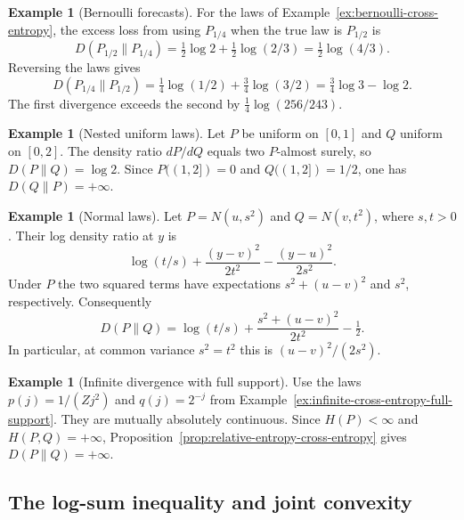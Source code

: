\documentclass[11pt,oneside]{book}
\theoremstyle{definition}
\newtheorem{example}[theorem]{Example}
\theoremstyle{remark}
\begin{document}
\begin{example}[Bernoulli forecasts]
\label{ex:bernoulli-relative-entropy}
For the laws of Example~\ref{ex:bernoulli-cross-entropy}, the excess
loss from using $P_{1/4}$ when the true law is $P_{1/2}$ is
\[
D(P_{1/2}\|P_{1/4})
=\tfrac12\log 2+\tfrac12\log(2/3)=\tfrac12\log(4/3).
\]
Reversing the laws gives
\[
D(P_{1/4}\|P_{1/2})
=\tfrac14\log(1/2)+\tfrac34\log(3/2)=\tfrac34\log 3-\log 2.
\]
The first divergence exceeds the second by $\tfrac14\log(256/243)$.
\end{example}

\begin{example}[Nested uniform laws]
\label{ex:nested-uniform-relative-entropy}
Let $P$ be uniform on $[0,1]$ and $Q$ uniform on $[0,2]$.
The density ratio $dP/dQ$ equals two $P$-almost surely, so
$D(P\|Q)=\log 2$. Since $P((1,2])=0$ and $Q((1,2])=1/2$,
one has $D(Q\|P)=+\infty$.
\end{example}

\begin{example}[Normal laws]
\label{ex:normal-relative-entropy}
Let $P=N(u,s^2)$ and $Q=N(v,t^2)$, where $s,t>0$. Their log density
ratio at $y$ is
\[
\log(t/s)+\frac{(y-v)^2}{2t^2}-\frac{(y-u)^2}{2s^2}.
\]
Under $P$ the two squared terms have expectations
$s^2+(u-v)^2$ and $s^2$, respectively. Consequently
\[
D(P\|Q)=\log(t/s)+\frac{s^2+(u-v)^2}{2t^2}-\tfrac12.
\]
In particular, at common variance $s^2=t^2$ this is
$(u-v)^2/(2s^2)$.
\end{example}

\begin{example}[Infinite divergence with full support]
\label{ex:infinite-relative-entropy-full-support}
Use the laws $p(j)=1/(Zj^2)$ and $q(j)=2^{-j}$ from
Example~\ref{ex:infinite-cross-entropy-full-support}. They are
mutually absolutely continuous. Since $H(P)<\infty$ and
$H(P,Q)=+\infty$, Proposition~\ref{prop:relative-entropy-cross-entropy}
gives $D(P\|Q)=+\infty$.
\end{example}

\subsection{The log-sum inequality and joint convexity}
\label{subsec:log-sum-joint-convexity}
\end{document}
